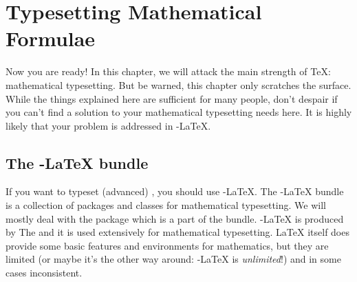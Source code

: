 %
%
%
%
 
\chapter{Typesetting Mathematical Formulae}

\begin{intro}
  Now you are ready! In this chapter, we will attack the main strength
  of \TeX{}: mathematical typesetting. But be warned, this chapter
  only scratches the surface. While the things explained here are
  sufficient for many people, don't despair if you can't find a
  solution to your mathematical typesetting needs here. It is highly likely
  that your problem is addressed in \AmS-\LaTeX{}.
\end{intro}
  


\section{The \texorpdfstring{\AmS}{AMS}-\LaTeX{} bundle}

If you want to typeset (advanced) , you should
use \AmS-\LaTeX{}. The \AmS-\LaTeX{} bundle is a collection of packages and classes for
mathematical typesetting. We will mostly deal with the  package
which is a part of the bundle. \AmS-\LaTeX{} is produced by The \emph{} 
and it is used extensively for mathematical typesetting. \LaTeX{} itself does provide
some basic features and environments for mathematics, but they are limited (or
maybe it's the other way around: \AmS-\LaTeX{} is \emph{unlimited}!) and
in some cases inconsistent. 

